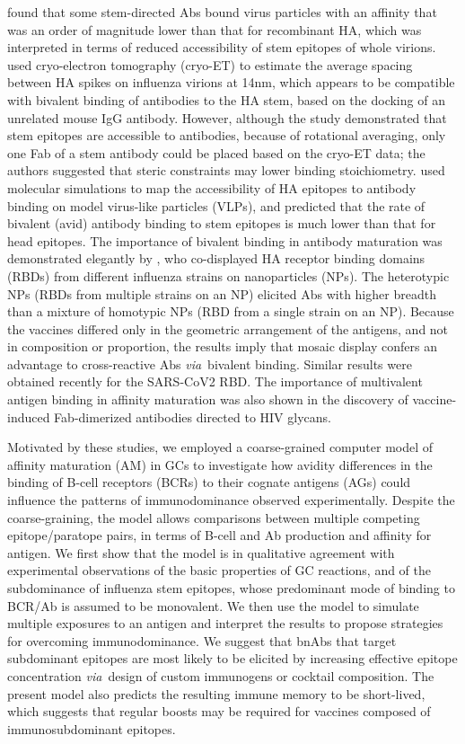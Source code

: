 \documentclass[utf8]{frontiersHLTH}%
\newcommand{\cred}[1]{\textsf{\color{red}#1}}
\def\via {{\it via}}
\begin{document}
\citet{andrews15} found that some stem-directed Abs bound
virus particles with an affinity that was an order of magnitude lower than that for
recombinant HA, which was interpreted in terms of reduced accessibility of
stem epitopes of whole virions.
%
\cred{\citet{harris13} used cryo-electron tomography (cryo-ET) to estimate the 
average spacing between HA spikes on influenza virions at 14nm, which
appears to be compatible with bivalent binding of antibodies to the HA
stem, based on the docking of an unrelated mouse IgG antibody.\cite{harris13}
However, although the study demonstrated that stem epitopes are
accessible to antibodies, because of rotational averaging, only one Fab
of a stem antibody could be placed based on the cryo-ET data; the authors suggested 
that steric constraints may lower binding stoichiometry.}
%
\citet{amitai20} used molecular simulations to map the accessibility
of HA epitopes to antibody binding on model virus-like particles (VLPs),
and predicted that the rate of bivalent (avid) antibody binding to stem
epitopes is much lower than that for head epitopes.
The importance of bivalent binding in antibody maturation was
demonstrated elegantly by \citet{kanekiyo19}, who co-displayed HA
receptor binding domains (RBDs) from different influenza strains on
nanoparticles (NPs). The heterotypic NPs (RBDs from multiple strains on an NP)
elicited Abs with higher breadth than a mixture of homotypic NPs (RBD from a single
strain on an NP). Because the vaccines differed only in the geometric
arrangement of the antigens, and not in composition or proportion, the results imply
that mosaic display confers an advantage to cross-reactive Abs
\via~bivalent binding\cite{kanekiyo19}. Similar results were obtained recently for the
SARS-CoV2 RBD.\cite{cohen21}
%
\cred{The importance of multivalent antigen binding in affinity maturation was
also shown in the discovery of vaccine-induced Fab-dimerized antibodies
directed to HIV glycans.\cite{williams21}}

Motivated by these studies, we employed a coarse-grained computer model
of affinity maturation (AM) in GCs to investigate how avidity
differences in the binding of B-cell receptors (BCRs) to their cognate antigens
(AGs) could influence the patterns of immunodominance observed
experimentally. Despite the coarse-graining, the model allows
comparisons between multiple competing epitope/paratope pairs,
in terms of B-cell and Ab production and affinity for antigen. We first show
that the model is in qualitative agreement with experimental observations of
the basic properties of GC reactions,
and of the subdominance of influenza stem epitopes, whose predominant mode of binding to BCR/Ab
is assumed to be monovalent.
We then use the model to simulate multiple exposures to an antigen
and interpret the results to propose strategies for
overcoming immunodominance. We suggest that bnAbs that target subdominant
epitopes are most likely to be elicited by increasing effective epitope
concentration \via~design of custom immunogens or cocktail composition.
The present model also predicts the resulting immune memory to be
short-lived, which suggests that regular boosts may be required for vaccines
composed of immunosubdominant epitopes.
\end{document}
